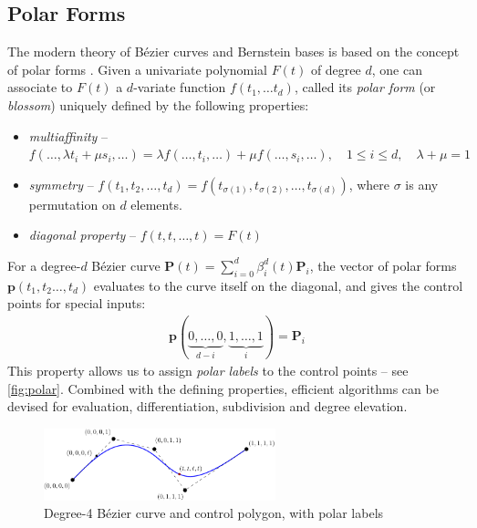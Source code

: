 \documentclass[12pt,final,3p]{elsarticle}
\begin{document}
\subsection{Polar Forms}\label{sec:motivation:polar}
The modern theory of B\'{e}zier curves and Bernstein bases is based on the concept of polar forms \cite{ ramshaw1987blossoming,ramshaw1989blossoms,goldman2003polar}. Given a univariate polynomial $F(t)$ of degree $d$, one can associate to $F(t)$ a $d$-variate function $f(t_{1},\ldots t_{d})$, called its \emph{polar form} (or \emph{blossom}) uniquely defined by the following properties:
\begin{itemize}
	\item \emph{multiaffinity} -- $f(\ldots,\lambda t_{i}+\mu s_{i},\ldots) = \lambda f(\ldots,t_{i},\ldots) + \mu f(\ldots,s_{i},\ldots),\quad  1 \leq i \leq d,\quad \lambda + \mu = 1$ 
	\item \emph{symmetry} -- $f(t_{1},t_{2},\ldots,t_{d}) = f(t_{\sigma(1)},t_{\sigma(2)},\ldots,t_{\sigma(d)})$, where $\sigma$ is any permutation on $d$ elements.
	\item \emph{diagonal property} -- $f(t,t,\ldots,t) = F(t)$
\end{itemize}

For a degree-$d$ B\'{e}zier curve $\mathbf{P}(t) = \sum_{i=0}^{d}\beta^{d}_{i}(t)\mathbf{P}_{i}$, the vector of polar forms $\mathbf{p}(t_{1},t_{2}\ldots,t_{d})$ evaluates to the curve itself on the diagonal, and gives the control points for special inputs:
\begin{align}\label{eq:polarcontrol}
\mathbf{p}(\underbrace{0, \ldots, 0}_{d-i}, \underbrace{1,\ldots,1}_{i}) = \mathbf{P}_{i}
\end{align}
This property allows us to assign \emph{polar labels} to the control points -- see \autoref{fig:polar}.  Combined with the defining properties, efficient algorithms can be devised for evaluation, differentiation, subdivision and degree elevation.

\begin{figure}[h]
	\centering
	\includegraphics[width=0.6\textwidth, keepaspectratio]{figures/polarform.pdf}
	\caption{Degree-4 B\'{e}zier curve and control polygon, with polar labels}
	\label{fig:polar}
\end{figure}
\end{document}
